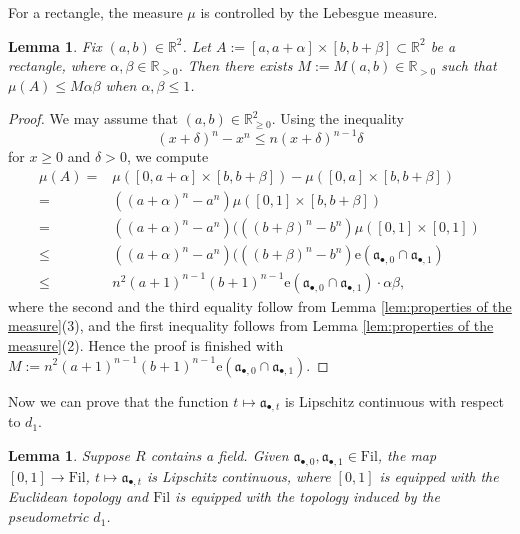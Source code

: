 \documentclass[11pt, leqno]{amsart}%
\theoremstyle{plain}
\newtheorem{lemma}[theorem]{Lemma}
\theoremstyle{definition}
\theoremstyle{remark}
\newcommand{\bR}{\mathbb{R}}
\newcommand{\fa}{\mathfrak{a}}
\newcommand{\e}{\mathrm{e}}
\newcommand{\Fil}{\mathrm{Fil}}
\numberwithin{equation}{section}
\begin{document}
For a rectangle, the measure $\mu$ is controlled by the Lebesgue measure.

\begin{lemma}\label{lem:absolute continuity}
    Fix $(a,b)\in\bR^2$. Let $A:=[a,a+\alpha]\times [b,b+\beta]\subset \bR^2$ be a rectangle, where $\alpha,\beta\in\bR_{>0}$. Then there exists $M:=M(a,b)\in\bR_{>0}$ such that $\mu(A)\le M\alpha\beta$ when $\alpha,\beta\le 1$.
\end{lemma}

\begin{proof}
    We may assume that $(a,b)\in\bR_{\ge 0}^2$. Using the inequality 
    \[
        (x+\delta)^n-x^n\le n(x+\delta)^{n-1} \delta
    \]
    for $x\ge 0$ and $\delta>0$, we compute 
    \begin{align*}
    \mu(A)=& \mu([0,a+\alpha]\times[b,b+\beta])-\mu([0,a]\times[b,b+\beta])\\
    =& ((a+\alpha)^n-a^n)\mu([0,1]\times [b,b+\beta])\\
    =& ((a+\alpha)^n-a^n)(((b+\beta)^n-b^n)\mu([0,1]\times[0,1])\\
    \le& ((a+\alpha)^n-a^n)(((b+\beta)^n-b^n)\e(\fa_{\bullet,0}\cap\fa_{\bullet,1})\\
    \le& n^2(a+1)^{n-1}(b+1)^{n-1}\e(\fa_{\bullet,0}\cap\fa_{\bullet,1})\cdot\alpha\beta,
    \end{align*}
    where the second and the third equality follow from Lemma \ref{lem:properties of the measure}(3), and the first inequality follows from Lemma \ref{lem:properties of the measure}(2). Hence the proof is finished with $M:=n^2(a+1)^{n-1}(b+1)^{n-1}\e(\fa_{\bullet,0}\cap\fa_{\bullet,1})$.
\end{proof}






Now we can prove that the function $t\mapsto \fa_{\bullet,t}$ is Lipschitz continuous with respect to $d_1$. %

\begin{lemma}\label{lem:continuity of geodesic}
    Suppose $R$ contains a field. Given $\fa_{\bullet,0},\fa_{\bullet,1}\in\Fil$, the map $[0,1]\to\Fil$, $t\mapsto\fa_{\bullet,t}$ is Lipschitz continuous, where $[0,1]$ is equipped with the Euclidean topology and $\Fil$ is equipped with the topology induced by the pseudometric $d_1$.
\end{lemma}
\end{document}
